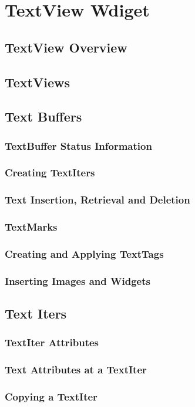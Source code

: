 \chapter{TextView Wdiget}
\section{TextView Overview}
\section{TextViews}
\section{Text Buffers}
\subsection{TextBuffer Status Information}
\subsection{Creating TextIters}
\subsection{Text Insertion, Retrieval and Deletion}
\subsection{TextMarks}
\subsection{Creating and Applying TextTags}
\subsection{Inserting Images and Widgets}
\section{Text Iters}
\subsection{TextIter Attributes}
\subsection{Text Attributes at a TextIter}
\subsection{Copying a TextIter}
